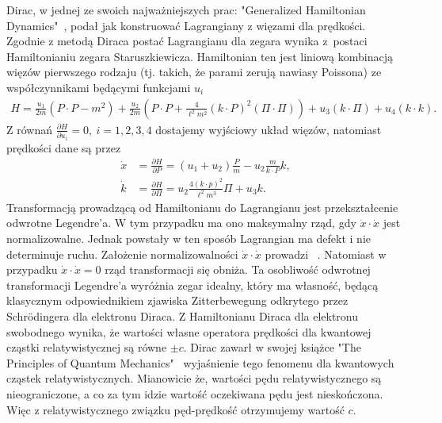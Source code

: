 Dirac, w jednej ze swoich najważniejszych prac: 
"Generalized Hamiltonian Dynamics"~\cite{DiracHam}, podał
jak konstruować Lagrangiany z więzami dla prędkości.
Zgodnie z metodą Diraca postać Lagrangianu dla zegara wynika 
z~postaci Hamiltonianiu zegara Staruszkiewicza. Hamiltonian
ten jest liniową kombinacją więzów pierwszego rodzaju (tj. 
takich, że parami zerują nawiasy Poissona) ze współczynnikami będącymi 
funkcjami $u_i$
\begin{align*}
H = \frac{u_1}{2m} \left(P\cdot P -m^2 \right) 
+ \frac{u_2}{2m } \left( P\cdot P + \frac{4}{\ell^2 m^2} (k\cdot P)^2 
(\Pi \cdot \Pi) \right)
+ u_3 (k \cdot \Pi ) + u_4 (k \cdot k).
\end{align*}
Z równań $\frac{\partial H}{\partial u_i} = 0 ,\ i=1,2,3,4$ 
dostajemy wyjściowy
układ więzów, natomiast prędkości dane są przez
\begin{align*}
\dot{x} &= \frac{\partial H}{\partial P} = 
(u_1 + u_2 )\frac{P}{m} - u_2 \frac{m}{k\cdot P} k,\\
\dot{k} &= \frac{\partial H}{\partial \Pi} =  
u_2\frac{4 (k\cdot p)^2}{\ell^2m^3}\Pi +u_3 k .
\end{align*}
Transformacją
prowadzącą od Hamiltonianu do Lagrangianu jest 
przekształcenie odwrotne Legendre'a. 
W tym przypadku ma ono maksymalny rząd, gdy $\dot{x} \cdot \dot{x}$ 
jest normalizowalne. Jednak powstały w ten sposób Lagrangian
ma defekt i nie determinuje ruchu. Założenie 
normalizowalności $\dot{x} \cdot \dot{x}$ prowadzi ~\cite{Bratek2015wiele}.
Natomiast w przypadku $\dot{x} \cdot \dot{x} = 0$  rząd transformacji
 się obniża. 
Ta osobliwość odwrotnej transformacji Legendre'a 
wyróżnia zegar idealny, który ma własność, będącą klasycznym 
odpowiednikiem zjawiska Zitterbewegung
odkrytego przez Schrödingera dla elektronu Diraca. 
Z Hamiltonianu Diraca dla elektronu swobodnego wynika, że 
wartości własne operatora prędkości dla kwantowej cząstki
relatywistycznej są równe $\pm c$. 
Dirac zawarł w swojej książce "The Principles of
Quantum Mechanics"~\cite{principia} 
wyjaśnienie tego fenomenu dla kwantowych
cząstek relatywistycznych. Mianowicie że, wartości pędu relatywistycznego
są nieograniczone, a co za tym idzie 
wartość oczekiwana pędu jest nieskończona. Więc 
z relatywistycznego związku pęd-prędkość otrzymujemy wartość $c$.


